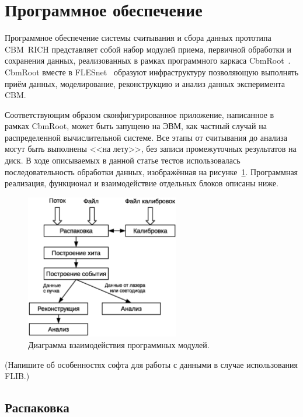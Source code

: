 \section{Программное обеспечение}\label{section:secSoft}

Программное обеспечение системы считывания и сбора данных прототипа CBM~RICH представляет собой набор модулей приема, первичной обработки и сохранения данных, реализованных в рамках программного каркаса CbmRoot~\cite{CBMROOT}. CbmRoot вместе в FLESnet~\cite{FLESnet} образуют инфраструктуру позволяющую выполнять приём данных, моделирование, реконструкцию и анализ данных эксперимента CBM.

Соответствующим образом сконфигурированное приложение, написанное в рамках CbmRoot, может быть запущено на ЭВМ, как частный случай на распределенной вычислительной системе. Все этапы от считывания до анализа могут быть выполнены <<на лету>>, без записи промежуточных результатов на диск. В ходе описываемых в данной статье тестов использовалась последовательность обработки данных, изображённая на рисунке~\ref{fig:SoftDiag}. Программная реализация, функционал и взаимодействие отдельных блоков описаны ниже.

\begin{figure}
\includegraphics[width=0.6\textwidth]{pictures/13_Software_diagram.eps}
\caption{Диаграмма взаимодействия программных модулей.}
\label{fig:SoftDiag}
\end{figure}

(Напишите об особенностях софта для работы с данными в случае использования FLIB.)

\subsection{Распаковка}

